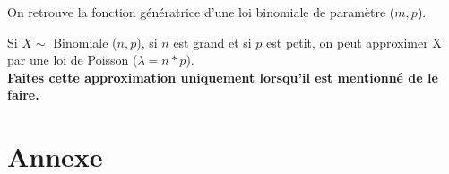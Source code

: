 \documentclass[10pt, french]{article}
\begin{document}
\begin{multicols*}{2}
\begin{definitionNOHFILLprop}
On retrouve la fonction génératrice d'une loi binomiale de paramètre ($m, p$).
\end{definitionNOHFILLprop}
\begin{definitionNOHFILLprop}
Si $X \sim$ Binomiale ($n,p$), si $n$ est grand et si $p$ est petit, on peut approximer X par une loi de Poisson ($\lambda = n * p$).\\

\textbf{Faites cette approximation uniquement lorsqu'il est mentionné de le faire.}
\end{definitionNOHFILLprop}
\end{multicols*}






\appendix
\section*{Annexe}
\renewcommand{\thesubsection}{\Alph{subsection}}
\end{document}
